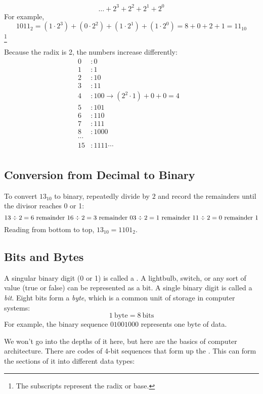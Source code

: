 \[
  \dots + 2^3 + 2^2 + 2^1 + 2^0
\]
For example,
\[
1011_2 = (1 \cdot 2^3) + (0 \cdot 2^2) + (1 \cdot 2^1) + (1 \cdot 2^0) = 8 + 0 + 2 + 1 = 11_{10}
\]\footnote{The subscripts represent the radix or base.}

Because the radix is 2, the numbers increase differently:
\begin{align*}
  0&: 0 \\
  1&: 1 \\
  2&: 10 \\
  3&: 11 \\
  4&: 100 \rightarrow (2^{2}\cdot 1) + 0 + 0 = 4 \\
  5&: 101 \\
  6&: 110 \\
  7&: 111 \\
  8&: 1000 \\
  \cdots& \\
  15&: 1111
  \cdots& \\
\end{align*}

\subsection*{Conversion from Decimal to Binary}
To convert $13_{10}$ to binary, repeatedly divide by $2$ and record the remainders until the divisor reaches 0 or 1:
\[
13 \div 2 = 6 \text{ remainder } 1 \\
6 \div 2 = 3 \text{ remainder } 0 \\
3 \div 2 = 1 \text{ remainder } 1 \\
1 \div 2 = 0 \text{ remainder } 1
\]
Reading from bottom to top, $13_{10} = 1101_2$.

\subsection{Bits and Bytes}
A singular binary digit (0 or 1) is called a . 
A lightbulb, switch, or any sort of  value (true or false) can be represented as a bit.
A single binary digit is called a \emph{bit}. 
Eight bits form a \emph{byte}, which is a common unit of storage in computer systems:
\[
1\ \text{byte} = 8\ \text{bits}
\]
For example, the binary sequence $01001000$ represents one byte of data.

We won't go into the depths of it here, but here are the basics of computer architecture. 
There are codes of 4-bit sequences that form up the . 
This can form the sections of it into different data types:


